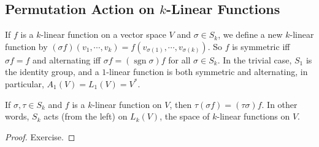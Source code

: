 \subsection{Permutation Action on $k$-Linear Functions}
If $f$ is a $k$-linear function on a vector space $V$ and $\sigma\in S_k$, we define a new $k$-linear function by $(\sigma f)(v_1,\cdots ,v_k)=f(v_{\sigma(1)},\cdots ,v_{\sigma(k)})$. So $f$ is symmetric iff $\sigma f=f$ and alternating iff $\sigma f=(\operatorname{sgn}\sigma)f$ for all $\sigma \in S_k$. In the trivial case, $S_1 $ is the identity group, and a $1$-linear function is both symmetric and alternating, in particular, $A_1(V)=L_1(V)=V^*$.
\begin{lemma}
    If $\sigma,\tau \in S_k$ and $f$ is a $k$-linear function on $V$, then $\tau(\sigma f)=(\tau\sigma) f$. In other words, $S_k$ acts (from the left) on $L_k(V)$, the space of $k$-linear functions on $V$.
\end{lemma}
\begin{proof}
    Exercise. 
\end{proof}
